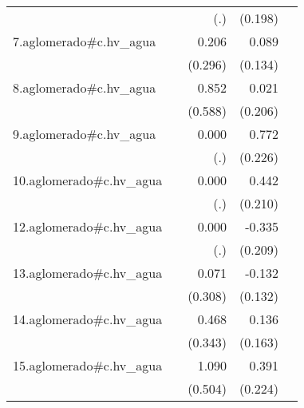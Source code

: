 {\begin{longtable}{l*{4}{D{.}{.}{-1}}}
            &                     &         (.)         &     (0.198)         &                     \\
\addlinespace
7.aglomerado#c.hv\_agua&                     &       0.206         &       0.089         &                     \\
            &                     &     (0.296)         &     (0.134)         &                     \\
\addlinespace
8.aglomerado#c.hv\_agua&                     &       0.852         &       0.021         &                     \\
            &                     &     (0.588)         &     (0.206)         &                     \\
\addlinespace
9.aglomerado#c.hv\_agua&                     &       0.000         &       0.772\sym{***}&                     \\
            &                     &         (.)         &     (0.226)         &                     \\
\addlinespace
10.aglomerado#c.hv\_agua&                     &       0.000         &       0.442\sym{*}  &                     \\
            &                     &         (.)         &     (0.210)         &                     \\
\addlinespace
12.aglomerado#c.hv\_agua&                     &       0.000         &      -0.335         &                     \\
            &                     &         (.)         &     (0.209)         &                     \\
\addlinespace
13.aglomerado#c.hv\_agua&                     &       0.071         &      -0.132         &                     \\
            &                     &     (0.308)         &     (0.132)         &                     \\
\addlinespace
14.aglomerado#c.hv\_agua&                     &       0.468         &       0.136         &                     \\
            &                     &     (0.343)         &     (0.163)         &                     \\
\addlinespace
15.aglomerado#c.hv\_agua&                     &       1.090\sym{*}  &       0.391         &                     \\
            &                     &     (0.504)         &     (0.224)         &                     \\

\end{longtable}}

